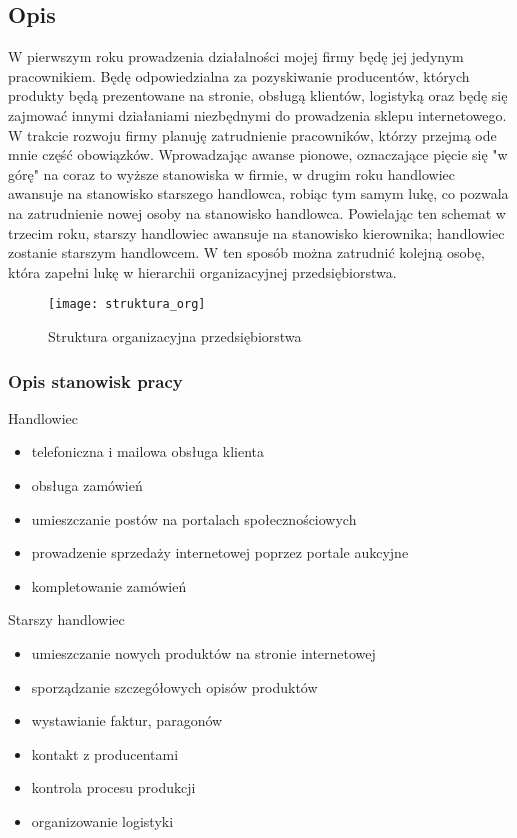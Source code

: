 \subsection{Opis}
			\par W pierwszym roku prowadzenia działalności mojej firmy będę jej jedynym pracownikiem. Będę odpowiedzialna za pozyskiwanie producentów, których produkty będą prezentowane na stronie, obsługą klientów, logistyką oraz będę się zajmować innymi działaniami niezbędnymi do prowadzenia sklepu internetowego. W trakcie rozwoju firmy planuję zatrudnienie pracowników, którzy przejmą ode mnie część obowiązków. Wprowadzając awanse pionowe, oznaczające pięcie się "w górę" na coraz to wyższe stanowiska w firmie, w drugim roku handlowiec awansuje na stanowisko starszego handlowca, robiąc tym samym lukę, co pozwala na zatrudnienie nowej osoby na stanowisko handlowca. Powielając ten schemat w trzecim roku, starszy handlowiec awansuje na stanowisko kierownika; handlowiec zostanie starszym handlowcem. W ten sposób można zatrudnić kolejną osobę, która zapełni lukę w hierarchii organizacyjnej przedsiębiorstwa. 
			 
			
			\begin{figure}[H]
				\centering
				\texttt{[image: struktura\_org]}
				\caption{Struktura organizacyjna przedsiębiorstwa}
				\label{search_pl}
			\end{figure}
			
			
		\subsubsection{Opis stanowisk pracy}
			\par Handlowiec
				\begin{itemize}
					\item telefoniczna i mailowa obsługa klienta
					\item obsługa zamówień 
					\item umieszczanie postów na portalach społecznościowych
					\item prowadzenie sprzedaży internetowej poprzez portale aukcyjne
					\item kompletowanie zamówień
			   	\end{itemize}
			
			\par Starszy handlowiec
				\begin{itemize}
					\item umieszczanie nowych produktów na stronie internetowej
					\item sporządzanie szczegółowych opisów produktów
					\item wystawianie faktur, paragonów
					\item kontakt z producentami
					\item kontrola procesu produkcji 
					\item organizowanie logistyki
				\end{itemize}	
					
